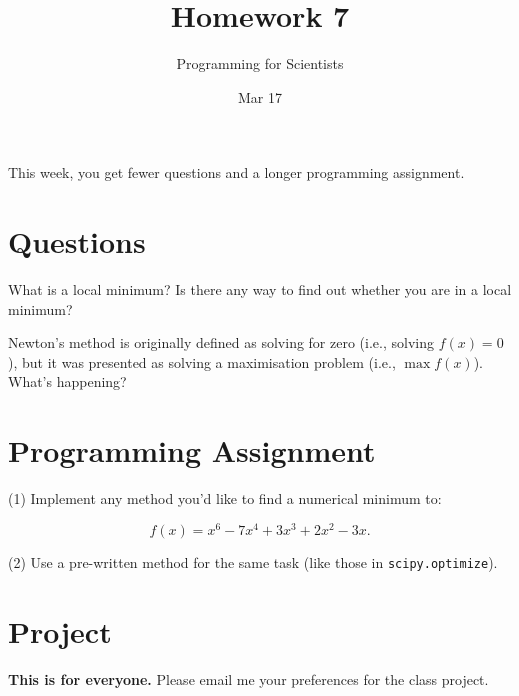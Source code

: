 
\author{Programming for Scientists}
\title{Homework 7}
\date{Mar 17}

\maketitle

This week, you get fewer questions and a longer programming assignment.

\chapter{Questions}

\question %
What is a local minimum? Is there any way to find out whether you are in a local minimum?

\question %

Newton's method is originally defined as solving for zero (i.e., solving $f(x) = 0$), but it was presented as solving a maximisation problem (i.e., $\max f(x)$). What's happening?

\chapter{Programming Assignment}

(1) Implement any method you'd like to find a numerical minimum to:

\begin{equation}
f(x) = x^6-7x^4+3x^3+2x^2-3x.
\end{equation}

(2) Use a pre-written method for the same task (like those in \lstinline{scipy.optimize}).

\chapter{Project}

\textbf{This is for everyone.} Please email me your preferences for the class project.


